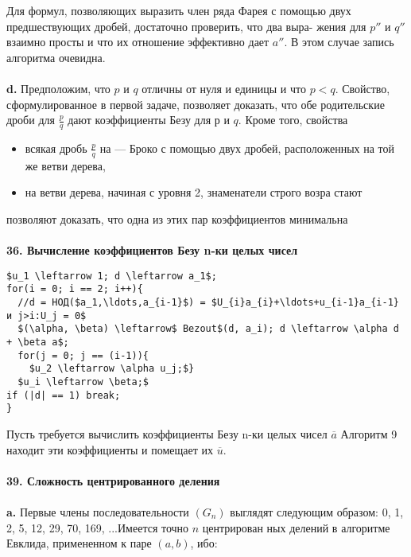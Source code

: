 Для формул, позволяющих выразить член ряда Фарея с помощью\linebreak
двух предшествующих дробей, достаточно проверить, что два выра-\linebreak
жения для $p''$ и $q''$  взаимно просты и что их отношение эффективно\linebreak
дает $a''$. В этом случае запись алгоритма очевидна.\\
\\
\hspace*{15pt}\textbf{d.} Предположим, что $p$ и $q$ отличны от нуля и единицы и что $p < q$.\linebreak
Свойство, сформулированное в первой задаче, позволяет доказать, что
обе родительские дроби для $\frac{p}{q}$ дают коэффициенты Безу для $р$ и $q$.
Кроме того, свойства
		\begin{itemize}
				\item всякая дробь $\frac{p}{q}$ на — Броко с помощью\linebreak
двух дробей, расположенных на той же ветви дерева,
				\item на ветви дерева, начиная с уровня 2, знаменатели строго возра­\linebreak
стают
\end{itemize}
позволяют доказать, что одна из этих пар коэффициентов минимальна\\
\\
\noindent\textbf{36. Вычисление коэффициентов Безу n-ки целых чисел}\\
\begin{lstlisting}[mathescape = true, caption = {Коэффициенты Безу}]
$u_1 \leftarrow 1; d \leftarrow a_1$;
for(i = 0; i == 2; i++){
  //d = НОД($a_1,\ldots,a_{i-1}$) = $U_{i}a_{i}+\ldots+u_{i-1}a_{i-1} и j>i:U_j = 0$
  $(\alpha, \beta) \leftarrow$ Bezout$(d, a_i); d \leftarrow \alpha d + \beta a$;
  for(j = 0; j == (i-1)){
    $u_2 \leftarrow \alpha u_j;$}
  $u_i \leftarrow \beta;$
if (|d| == 1) break;
}
\end{lstlisting}
\newpage
Пусть требуется вычислить коэффициенты Безу n-ки целых чисел $\overline{a}$\linebreak
Алгоритм 9 находит эти коэффициенты и помещает их $\overline{u}$.\\
\\
\noindent\textbf{39. Сложность центрированного деления}\\
\\
\hspace*{15pt}\textbf{a.} Первые члены последовательности $(G_n)$ выглядят следующим\linebreak
образом: 0, 1, 2, 5, 12, 29, 70, 169, ...Имеется точно $n$ центрирован­\linebreak
ных делений в алгоритме Евклида, примененном к паре $(a, b)$, ибо:

